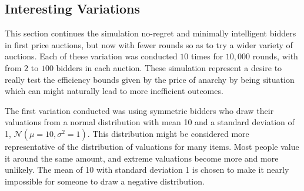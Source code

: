 \documentclass[12pt,twoside]{reedthesis}
\begin{document}
\label{section:BigSims}
\subsection{Interesting Variations}
This section continues the simulation no-regret and minimally intelligent bidders in first price auctions, but now with fewer rounds so as to try a wider variety of auctions. Each of these variation was conducted $10$ times for $10,000$ rounds, with from $2$ to $100$ bidders in each auction. These simulation represent a desire to really test the efficiency bounds given by the price of anarchy by being situation which can might naturally lead to more inefficient outcomes.

The first variation conducted was using symmetric bidders who draw their valuations from a normal distribution with mean 10 and a standard deviation of 1, $\mathcal{N}(\mu = 10, \sigma^2 =1)$. This distribution might be considered more representative of the distribution of valuations for many items. Most people value it around the same amount, and extreme valuations become more and more unlikely. The mean of 10 with standard deviation 1 is chosen to make it nearly impossible for someone to draw a negative distribution.  
\end{document}
